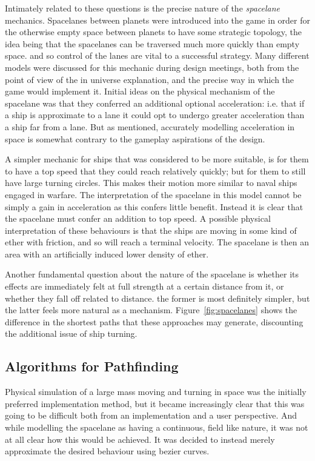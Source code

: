 Intimately related to these questions is the precise nature of the \emph{spacelane} mechanics. Spacelanes between planets were introduced into the game in order for the otherwise empty space between planets to have some strategic topology, the idea being that the spacelanes can be traversed much more quickly than empty space. and so control of the lanes are vital to a successful strategy. Many different models were discussed for this mechanic during design meetings, both from the point of view of the in universe explanation, and the precise way in which the game would implement it. Initial ideas on the physical mechanism of the spacelane was that they conferred an additional optional acceleration: i.e. that if a ship is approximate to a lane it could opt to undergo greater acceleration than a ship far from a lane. But as mentioned, accurately modelling acceleration in space is somewhat contrary to the gameplay aspirations of the design. 

A simpler mechanic for ships that was considered to be more suitable, is for them to have a top speed that they could reach relatively quickly; but for them to still have large turning circles. This makes their motion more similar to naval ships engaged in warfare. The interpretation of the spacelane in this model cannot be simply a gain in acceleration as this confers little benefit. Instead it is clear that the spacelane must confer an addition to top speed. A possible physical interpretation of these behaviours is that the ships are moving in some kind of ether with friction, and so will reach a terminal velocity. The spacelane is then an area with an artificially induced lower density of ether.

Another fundamental question about the nature of the spacelane is whether its effects are immediately felt at full strength at a certain distance from it, or whether they fall off related to distance. the former is most definitely simpler, but the latter feels more natural as a mechanism. Figure~\ref{fig:spacelanes} shows the difference in the shortest paths that these approaches may generate, discounting the additional issue of ship turning.

\subsection{Algorithms for Pathfinding}

Physical simulation of a large mass moving and turning in space was the initially preferred implementation method, but it became increasingly clear that this was going to be difficult both from an implementation and a user perspective. And while modelling the spacelane as having a continuous, field like nature, it was not at all clear how this would be achieved. It was decided to instead merely approximate the desired behaviour using bezier curves.

